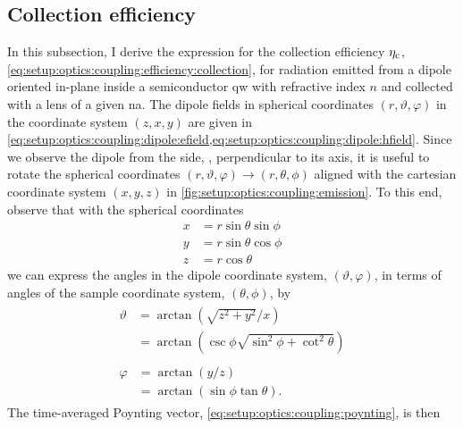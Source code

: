 \subsection{Collection efficiency}\label{subsec:app:setup:optics:collection}
In this subsection, I derive the expression for the collection efficiency $\eta_{\mathrm{c}}$, \cref{eq:setup:optics:coupling:efficiency:collection}, for radiation emitted from a dipole oriented in-plane inside a semiconductor \gls{qw} with refractive index $n$ and collected with a lens of a given \gls{na}.
The dipole fields in spherical coordinates $(r, \vartheta, \varphi)$ in the coordinate system $(z, x, y)$ are given in \cref{eq:setup:optics:coupling:dipole:efield,eq:setup:optics:coupling:dipole:hfield}.
Since we observe the dipole from the side, \ie, perpendicular to its axis, it is useful to rotate the spherical coordinates $(r, \vartheta, \varphi) \to (r, \theta, \phi)$ aligned with the cartesian coordinate system $(x, y, z)$ in \cref{fig:setup:optics:coupling:emission}.
To this end, observe that with the spherical coordinates
\begin{align}
    x &= r\sin\theta\sin\phi \\
    y &= r\sin\theta\cos\phi \\
    z &= r\cos\theta
\end{align}
we can express the angles in the dipole coordinate system, $(\vartheta, \varphi)$, in terms of angles of the sample coordinate system, $(\theta, \phi)$, by
\begin{align}
    \begin{split}\label{eq:app:setup:optics:collection:vartheta}
        \vartheta &= \arctan(\sqrt{z^2 + y^2}/x) \\
                  &= \arctan(\csc\phi\sqrt{\sin^2\phi + \cot^2\theta})
    \end{split} \\
    \begin{split}\label{eq:app:setup:optics:collection:varphi}
        \varphi &= \arctan(y/z) \\
                &= \arctan(\sin\phi\tan\theta).
    \end{split}
\end{align}
The time-averaged Poynting vector, \cref{eq:setup:optics:coupling:poynting}, is then
